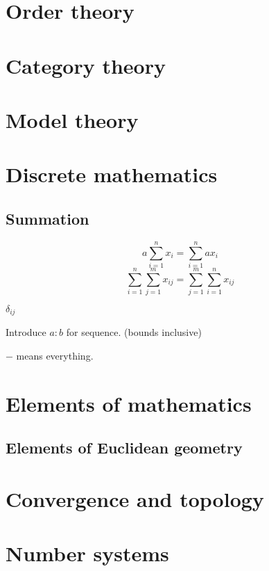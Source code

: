 \documentclass{report}
\begin{document}
\part{Order theory}
\setcounter{chapter}{0} %


\part{Category theory}
\setcounter{chapter}{0} %


\part{Model theory}
\setcounter{chapter}{0} %


\part{Discrete mathematics}
\setcounter{chapter}{0} %
\chapter{Summation}
\[ a\sum_{i=1}^n x_i = \sum_{i=1}^n ax_i \]
\[ \sum_{i=1}^n\sum_{j=1}^m x_{ij} = \sum_{j=1}^m\sum_{i=1}^n x_{ij} \]

$\delta_{ij}$

Introduce $a:b$ for sequence. (bounds inclusive)

$-$ means everything.



\part{Elements of mathematics}
\setcounter{chapter}{0} %
\chapter{Elements of Euclidean geometry}


\part{Convergence and topology}
\setcounter{chapter}{0} %


\part{Number systems}
\setcounter{chapter}{0} %

\end{document}
